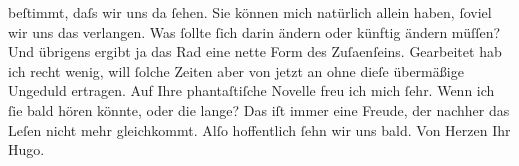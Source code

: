 \begin{ledgroupsized}[t]{13cm}
               beſtimmt, daſs wir uns da ſehen. Sie können mich natürlich allein haben, ſoviel wir
               uns das verlangen. Was ſollte ſich darin ändern oder künftig ändern müſſen? Und
               übrigens ergibt ja das Rad eine nette Form des Zuſa{\geminationm}enſeins.\pend
           \pstart
           Gearbeitet hab ich recht {\pb}wenig,
               will ſolche Zeiten aber von je\introOben{}t\introOben{}zt an ohne dieſe übermäßige
               Ungeduld ertragen. Auf Ihre phantaſtiſche Novelle freu ich mich ſehr. Wenn ich ſie bald hören könnte, oder
               die lange? Das iſt immer eine
               Freude, der nachher das Leſen nicht mehr gleichkommt.\pend
           \pstart Alſo hoffentlich ſehn wir uns bald. Von Herzen Ihr \spacefill\mbox{Hugo.}\pend{}
         
         \endnumbering{}\end{ledgroupsized}  \newcommand{\dateiname}{L01061}\newcommand{\titel}{Hugo von Hofmannsthal an Arthur Schnitzler, 27. 7. 1900}\newcommand{\editorInnen}{Martin Anton Müller und Gerd-Hermann Susen}
      